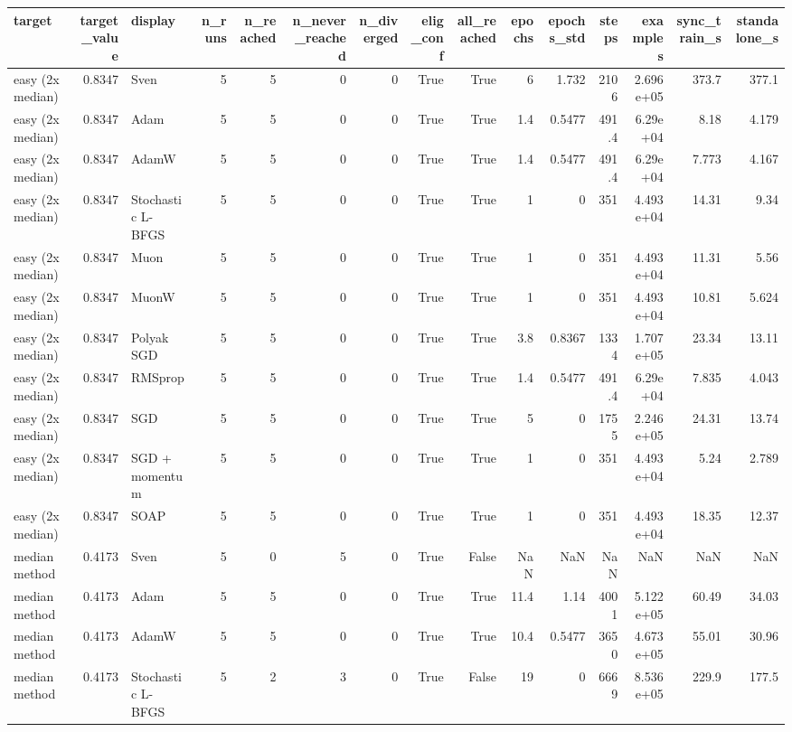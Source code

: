 \begin{tabular}{lrlrrrrrrrrrrrr}
\toprule
target & target\_value & display & n\_runs & n\_reached & n\_never\_reached & n\_diverged & elig\_conf & all\_reached & epochs & epochs\_std & steps & examples & sync\_train\_s & standalone\_s \\
\midrule
easy (2x median) & 0.8347 & Sven & 5 & 5 & 0 & 0 & True & True & 6 & 1.732 & 2106 & 2.696e+05 & 373.7 & 377.1 \\
easy (2x median) & 0.8347 & Adam & 5 & 5 & 0 & 0 & True & True & 1.4 & 0.5477 & 491.4 & 6.29e+04 & 8.18 & 4.179 \\
easy (2x median) & 0.8347 & AdamW & 5 & 5 & 0 & 0 & True & True & 1.4 & 0.5477 & 491.4 & 6.29e+04 & 7.773 & 4.167 \\
easy (2x median) & 0.8347 & Stochastic L-BFGS & 5 & 5 & 0 & 0 & True & True & 1 & 0 & 351 & 4.493e+04 & 14.31 & 9.34 \\
easy (2x median) & 0.8347 & Muon & 5 & 5 & 0 & 0 & True & True & 1 & 0 & 351 & 4.493e+04 & 11.31 & 5.56 \\
easy (2x median) & 0.8347 & MuonW & 5 & 5 & 0 & 0 & True & True & 1 & 0 & 351 & 4.493e+04 & 10.81 & 5.624 \\
easy (2x median) & 0.8347 & Polyak SGD & 5 & 5 & 0 & 0 & True & True & 3.8 & 0.8367 & 1334 & 1.707e+05 & 23.34 & 13.11 \\
easy (2x median) & 0.8347 & RMSprop & 5 & 5 & 0 & 0 & True & True & 1.4 & 0.5477 & 491.4 & 6.29e+04 & 7.835 & 4.043 \\
easy (2x median) & 0.8347 & SGD & 5 & 5 & 0 & 0 & True & True & 5 & 0 & 1755 & 2.246e+05 & 24.31 & 13.74 \\
easy (2x median) & 0.8347 & SGD + momentum & 5 & 5 & 0 & 0 & True & True & 1 & 0 & 351 & 4.493e+04 & 5.24 & 2.789 \\
easy (2x median) & 0.8347 & SOAP & 5 & 5 & 0 & 0 & True & True & 1 & 0 & 351 & 4.493e+04 & 18.35 & 12.37 \\
median method & 0.4173 & Sven & 5 & 0 & 5 & 0 & True & False & NaN & NaN & NaN & NaN & NaN & NaN \\
median method & 0.4173 & Adam & 5 & 5 & 0 & 0 & True & True & 11.4 & 1.14 & 4001 & 5.122e+05 & 60.49 & 34.03 \\
median method & 0.4173 & AdamW & 5 & 5 & 0 & 0 & True & True & 10.4 & 0.5477 & 3650 & 4.673e+05 & 55.01 & 30.96 \\
median method & 0.4173 & Stochastic L-BFGS & 5 & 2 & 3 & 0 & True & False & 19 & 0 & 6669 & 8.536e+05 & 229.9 & 177.5 \\

\end{tabular}
